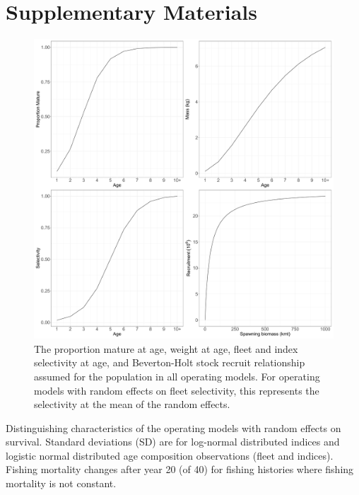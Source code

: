 \documentclass[
  12pt,
]{article}
\begin{document}
\pagebreak

\setcounter{figure}{0}
\renewcommand\thefigure{S\arabic{figure}}

\setcounter{table}{0}
\renewcommand\thetable{S\arabic{table}}

\hypertarget{supplementary-materials}{%
\section*{Supplementary Materials}\label{supplementary-materials}}

\begin{figure}[!ht]
\begin{center}
\includegraphics[width = \textwidth]{om_input_plots_figure}
\end{center}
\caption{The proportion mature at age, weight at age, fleet and index selectivity at age, and Beverton-Holt stock recruit relationship assumed for the population in all operating models. For operating models with random effects on fleet selectivity, this represents the selectivity at the mean of the random effects.}\label{om_inputs_fig}
\end{figure}

\begin{landscape}
\begin{table}
\caption{Distinguishing characteristics of the operating models with random effects on survival. Standard deviations (SD) are for log-normal distributed indices and logistic normal distributed age composition observations (fleet and indices). Fishing mortality changes after year 20 (of 40) for fishing histories where fishing mortality is not constant.}\label{naa_om_table}
{\footnotesize }
\end{table}
\end{landscape}
\end{document}
